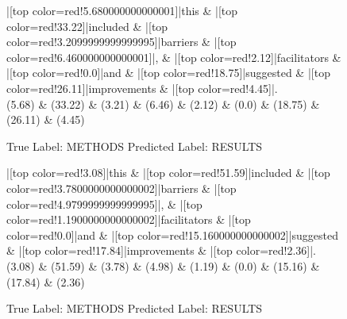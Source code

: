 \documentclass[a4paper, landscape]{article}
\begin{document}
\begin{figure}
\begin{center}
\begin{dependency}
\begin{deptext}
|[top color=red!5.680000000000001]|this \& |[top color=red!33.22]|included \& |[top color=red!3.2099999999999995]|barriers \& |[top color=red!6.460000000000001]|, \& |[top color=red!2.12]|facilitators \& |[top color=red!0.0]|and \& |[top color=red!18.75]|suggested \& |[top color=red!26.11]|improvements \& |[top color=red!4.45]|.\\
(5.68) \& (33.22) \& (3.21) \& (6.46) \& (2.12) \& (0.0) \& (18.75) \& (26.11) \& (4.45)\\
\end{deptext}
\end{dependency}
\end{center}
\caption{True Label: METHODS Predicted Label: RESULTS}
\end{figure}
\clearpage
\begin{figure}
\begin{center}
\begin{dependency}
\begin{deptext}
|[top color=red!3.08]|this \& |[top color=red!51.59]|included \& |[top color=red!3.7800000000000002]|barriers \& |[top color=red!4.9799999999999995]|, \& |[top color=red!1.1900000000000002]|facilitators \& |[top color=red!0.0]|and \& |[top color=red!15.160000000000002]|suggested \& |[top color=red!17.84]|improvements \& |[top color=red!2.36]|.\\
(3.08) \& (51.59) \& (3.78) \& (4.98) \& (1.19) \& (0.0) \& (15.16) \& (17.84) \& (2.36)\\
\end{deptext}
\end{dependency}
\end{center}
\caption{True Label: METHODS Predicted Label: RESULTS}
\end{figure}
\end{document}
